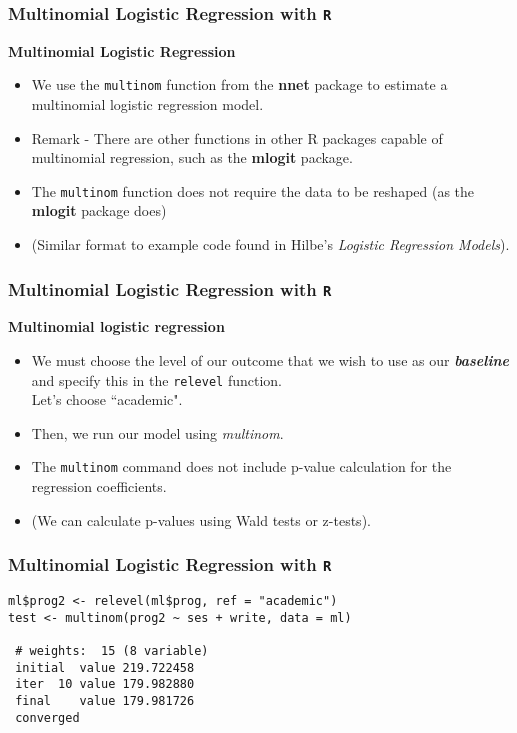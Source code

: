 \documentclass[00-GLMregslides.tex]{subfiles}
\begin{document}
\begin{frame}[fragile]
\frametitle{Multinomial Logistic Regression with \texttt{R}}
\Large
\textbf{Multinomial Logistic Regression}
\begin{itemize}
\item 
We use the \texttt{multinom} function from the \textbf{nnet} package to estimate a multinomial logistic regression model. 

\item Remark - There are other functions in other R packages capable of multinomial regression, such as the \textbf{mlogit} package. 
\item
  The \texttt{multinom} function does not require the data to be reshaped (as the \textbf{mlogit} package does) 
\item (Similar format to example code found in Hilbe's \textit{Logistic Regression Models}).
\end{itemize}
\end{frame}
  \begin{frame}[fragile]
  	\Large
  	\frametitle{Multinomial Logistic Regression with \texttt{R}}
\textbf{Multinomial logistic regression}
\begin{itemize}
\item  We must choose the level of our outcome that we wish to use as our \textbf{\textit{baseline}} and specify this in the \texttt{relevel} function. \\ Let's choose ``academic".
\item Then, we run our model using \textit{multinom}. 
\item The \texttt{multinom} command does not include p-value calculation for the regression coefficients.
\item (We can calculate p-values using Wald tests or z-tests).
 
\end{itemize}
\end{frame}
\begin{frame}[fragile]
\frametitle{Multinomial Logistic Regression with \texttt{R}}
\begin{framed}
	\begin{verbatim}
ml$prog2 <- relevel(ml$prog, ref = "academic")
test <- multinom(prog2 ~ ses + write, data = ml)
 
 # weights:  15 (8 variable)
 initial  value 219.722458 
 iter  10 value 179.982880
 final    value 179.981726 
 converged
\end{verbatim}
\end{framed}
\end{frame}
\end{document}
